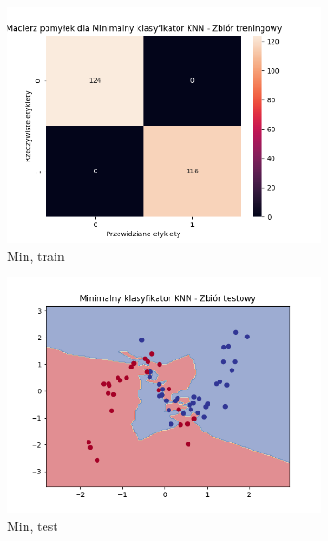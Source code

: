 \documentclass[12pt]{article}
\newcommand*{\subfigwidth}{0.24\textwidth}
\begin{document}
\begin{figure}[H]
\begin{subfigure}[t]{\subfigwidth}
        \includegraphics[width=\linewidth]{img/exp_2/knn/2_3/min/train_matrix.png}
        \caption{Min, train}
    \end{subfigure}
    \hfill
    \begin{subfigure}[t]{\subfigwidth}
        \includegraphics[width=\linewidth]{img/exp_2/knn/2_3/min/test_boundary.png}
        \caption{Min, test}
    \end{subfigure}
    \hfill
    \begin{subfigure}[t]{\subfigwidth}

\end{subfigure}
\end{figure}
\end{document}
